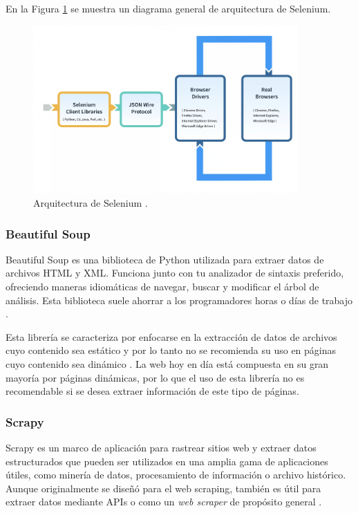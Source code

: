En la Figura \ref{fig:selenium} se muestra un diagrama general de arquitectura
de Selenium.

\begin{figure}[!htbp]
  \centering
  \includegraphics[width=0.9\textwidth]{imagenes/02-marco-teorico/arquitectura-selenium.png}
  \caption[Arquitectura de Selenium]{Arquitectura de Selenium \cite{selenium_webdriver}.}
  \label{fig:selenium}
\end{figure}

\subsubsection{Beautiful Soup}

Beautiful Soup es una biblioteca de Python utilizada para extraer datos de
archivos HTML y XML. Funciona junto con tu analizador de sintaxis preferido,
ofreciendo maneras idiomáticas de navegar, buscar y modificar el árbol de análisis.
Esta biblioteca suele ahorrar a los programadores horas o días de trabajo \cite{beautiful_soup}.

Esta librería se caracteriza por enfocarse en la extracción de datos de archivos
cuyo contenido sea estático y por lo tanto no se recomienda su uso en páginas
cuyo contenido sea dinámico \cite{beautiful_soup}. La web hoy en día está
compuesta en su gran mayoría por páginas dinámicas, por lo que el uso de esta
librería no es recomendable si se desea extraer información de este tipo
de páginas.

\subsubsection{Scrapy}

Scrapy es un marco de aplicación para rastrear sitios web y extraer datos
estructurados que pueden ser utilizados en una amplia gama de aplicaciones útiles,
como minería de datos, procesamiento de información o archivo histórico. Aunque
originalmente se diseñó para el web scraping, también es útil para extraer datos
mediante APIs o como un \textit{web scraper} de propósito general \cite{scrapy_overview}.

